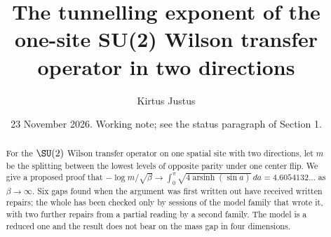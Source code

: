 
\title[Tunnelling exponent, one site, two directions]{The tunnelling exponent of the one-site SU(2) Wilson transfer operator in two directions}
\author{Kirtus Justus}
\address{Theoretical Physicist, Port Coquitlam, British Columbia, Canada}
\date{23 November 2026. Working note; see the status paragraph of Section 1.}

\begin{abstract}
For the $\SU(2)$ Wilson transfer operator on one spatial site with two directions, let $m$ be the splitting
between the lowest levels of opposite parity under one center flip. We give a proposed proof that
$-\log m/\sqrt\beta\to\int_0^\pi\sqrt{4\operatorname{arsinh}(\sin a)}\,da=4.6054132\ldots$ as $\beta\to\infty$. Six gaps
found when the argument was first written out have received written repairs; the whole has been checked only
by sessions of the model family that wrote it, with two further repairs from a partial reading by a second
family. The model is a reduced one and the result does not bear on the mass gap in four dimensions.
\end{abstract}
\maketitle
\tableofcontents



